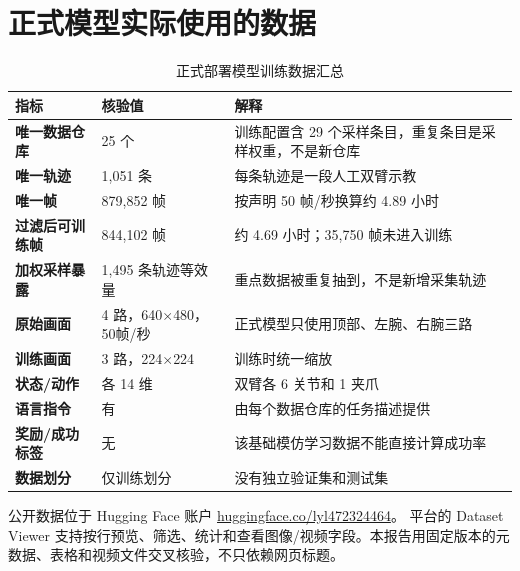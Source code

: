 

\section{正式模型实际使用的数据}

\begin{table}[H]
\centering
\caption{正式部署模型训练数据汇总}
\begin{tabularx}{\textwidth}{>{\bfseries}p{34mm}p{38mm}X}
\toprule
指标 & 核验值 & 解释\\
\midrule
唯一数据仓库 & 25 个 & 训练配置含 29 个采样条目，重复条目是采样权重，不是新仓库\\
唯一轨迹 & 1,051 条 & 每条轨迹是一段人工双臂示教\\
唯一帧 & 879,852 帧 & 按声明 50 帧/秒换算约 4.89 小时\\
过滤后可训练帧 & 844,102 帧 & 约 4.69 小时；35,750 帧未进入训练\\
加权采样暴露 & 1,495 条轨迹等效量 & 重点数据被重复抽到，不是新增采集轨迹\\
原始画面 & 4 路，640$\times$480，50帧/秒 & 正式模型只使用顶部、左腕、右腕三路\\
训练画面 & 3 路，224$\times$224 & 训练时统一缩放\\
状态/动作 & 各 14 维 & 双臂各 6 关节和 1 夹爪\\
语言指令 & 有 & 由每个数据仓库的任务描述提供\\
奖励/成功标签 & 无 & 该基础模仿学习数据不能直接计算成功率\\
数据划分 & 仅训练划分 & 没有独立验证集和测试集\\
\bottomrule
\end{tabularx}
\end{table}

公开数据位于 Hugging Face 账户
\href{https://huggingface.co/lyl472324464}{huggingface.co/lyl472324464}。
平台的 Dataset Viewer 支持按行预览、筛选、统计和查看图像/视频字段\cite{hf_dataset_viewer}。本报告用固定版本的元数据、表格和视频文件交叉核验，不只依赖网页标题。


